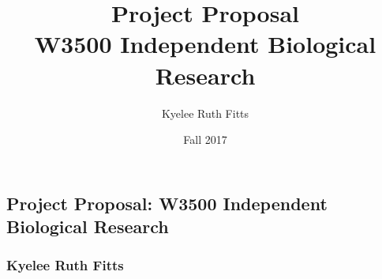 \documentclass[a4paper,10pt]{article}
\begin{document}
\title{\vspace{-2.0cm}
  Project Proposal \\
  \large W3500 Independent Biological Research \\
}

\author{
  Kyelee Ruth Fitts
}

\date{Fall 2017}
  

\subsection*{Project Proposal: W3500 Independent Biological Research}
\subsubsection*{Kyelee Ruth Fitts}

%
%
%
%
\end{document}
